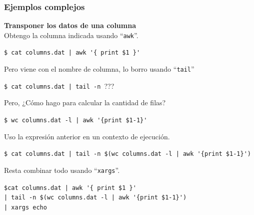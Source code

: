 \documentclass{beamer}
\begin{document}
\begin{frame}[fragile,t]
    \frametitle{\small Ejemplos complejos}
    \textbf{Transponer los datos de una columna}\\
    \vspace{0.3cm}
    \small \pause
    Obtengo la columna indicada usando ``\texttt{awk}''.\\
    \vspace{-0.3cm} \scriptsize
    \begin{block}{\vspace*{-3ex}}
    \texttt{\$}\verb: cat columns.dat | awk '{ print $1 }':
    \vspace*{0.5ex}
    \end{block}
    \vspace{0.2cm}
    \small \pause
    Pero viene con el nombre de columna, lo borro usando ``\texttt{tail}''
    \vspace{-0.3cm} \scriptsize
    \begin{block}{\vspace*{-3ex}}
    \texttt{\$}\verb: cat columns.dat | tail -n :\textcolor{naranjauca}{???} 
    \vspace*{0.5ex}
    \end{block}
    \vspace{0.2cm}
    \small \pause
	Pero, ¿C\'omo hago para calcular la cantidad de filas?
    \vspace{-0.3cm} \scriptsize
    \begin{block}{\vspace*{-3ex}}
    \texttt{\$}\verb: wc columns.dat -l | awk '{print $1-1}':
    \vspace*{0.5ex}
    \end{block}
    \vspace{0.2cm}
    \small \pause
    Uso la expresi\'on anterior en un contexto de ejecuci\'on.
    \vspace{-0.3cm} \scriptsize
    \begin{block}{\vspace*{-3ex}}
    \texttt{\$}\verb: cat columns.dat | tail -n $(wc columns.dat -l | awk '{print $1-1}'):
    \vspace*{0.5ex}
    \end{block}
    \vspace{0.3cm}
    \normalsize \pause
    Resta combinar todo usando ``\verb|xargs|''.
    \vspace{-0.3cm} \small
    \begin{block}{\vspace*{-3ex}}
    \texttt{\$}\verb:cat columns.dat | awk '{ print $1 }':\\
    \hspace*{1.2cm} \verb:| tail -n $(wc columns.dat -l | awk '{print $1-1}') :\\
    \hspace*{1.2cm} \verb:| xargs echo:
    \vspace*{0.5ex}
    \end{block}
\end{frame}
\end{document}
